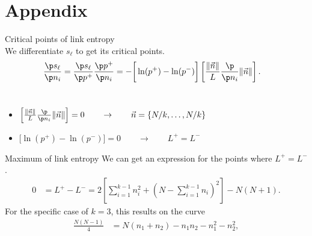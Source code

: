 \appendix
\section{Appendix}


\begin{frame}{Critical points of link entropy}
\setlength\fboxrule{0.5pt}
\setlength\fboxsep{4pt}
\\[1em]

We differentiate $s_\ell$ to get its critical points.
\begin{align}
	\frac{\p s_\ell }{\p n_i} &= \frac{\p s_\ell}{\p p^{+}} \frac{\p p^{+}}{\p n_i} = - \bigg[ \ln(p^{+}) - \ln(p^{-}) \bigg] \left[ \frac{\|\vec{n}\|}{L}  \frac{\p}{\p n_i} \|\vec{n}\|  \right] 
.\end{align}
\\[2em]

\begin{itemize}
	\item $\left[ \frac{\|\vec{n}\|}{L}  \frac{\p}{\p n_i} \|\vec{n}\|  \right] =0\qquad  \to \qquad \vec{n} = \{N / k, \ldots, N / k \}$ 
	\item $\Big[ \ln(p^{+}) - \ln(p^{-}) \Big] = 0 \qquad \to \qquad L^{+} = L^{-}$
\end{itemize}
\end{frame}

\begin{frame}{Maximum of link entropy}
We can get an expression for the points where $L^{+}=L^{-}$.
\begin{align*}
     0 &= L^{+} - L^{-} =  2 \left[ \sum_{i=1}^{k-1} n_i^2 + \left( N-\sum_{i=1}^{k-1} n_i \right)^2   \right]   - N(N +  1) 
.\end{align*}
For the specific case of $k=3$, this results on the curve\\
\begin{equation}
	\begin{aligned}
		\frac{N \left(N - 1\right)}{4} &=  N \left(n_{1} + n_{2}\right) - n_{1} n_{2}  - n_{1}^{2} - n_{2}^{2}, \label{eq:Lp_eq_Lm}
	\end{aligned}
\end{equation}
\end{frame}

